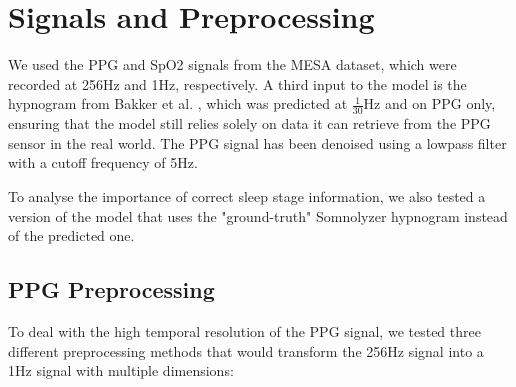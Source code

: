 \section{Signals and Preprocessing}

We used the PPG and SpO2 signals from the MESA dataset, which were recorded at 256Hz and 1Hz, respectively. A third input to the model is the hypnogram from Bakker et al. \cite{bakker2021estimating}, which was predicted at $\frac{1}{30}$Hz and on PPG only, ensuring that the model still relies solely on data it can retrieve from the PPG sensor in the real world.
The PPG signal has been denoised using a lowpass filter with a cutoff frequency of 5Hz.

To analyse the importance of correct sleep stage information, we also tested a version of the model that uses the "ground-truth" Somnolyzer hypnogram instead of the predicted one.

\subsection*{PPG Preprocessing}

To deal with the high temporal resolution of the PPG signal, we tested three different preprocessing methods that would transform the 256Hz signal into a 1Hz signal with multiple dimensions:

